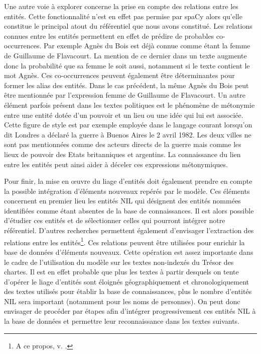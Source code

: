 \documentclass[a4paper,12pt,twoside]{book}
\begin{document}
	Une autre voie à explorer concerne la prise en compte des relations entre les entités. Cette fonctionnalité n'est en effet pas permise par spaCy alors qu'elle constitue le principal atout du référentiel que nous avons constitué. Les relations connues entre les entités permettent en effet de prédire de probables co-occurrences. Par exemple Agnès du Bois est déjà connue comme étant la femme de Guillaume de Flavacourt. La mention de ce dernier dans un texte augmente donc la probabilité que sa femme le soit aussi, notamment si le texte contient le mot \og Agnès\fg{}. Ces co-occurrences peuvent également être déterminantes pour former les alias des entités. Dans le cas précédent, la même Agnès du Bois peut être mentionnée par l'expression \og femme de Guillaume de Flavacourt\fg{}. Un autre élément parfois présent dans les textes politiques est le phénomène de métonymie entre une entité dotée d'un pouvoir et un lieu ou une idée qui lui est associée. Cette figure de style est par exemple employée dans le langage courant lorsqu'on dit \og Londres a déclaré la guerre à Buenos Aires le 2 avril 1982\fg{}. Les deux villes ne sont pas mentionnées comme des acteurs directs de la guerre mais comme les lieux de pouvoir des Etats britanniques et argentins. La connaissance du lien entre les entités peut ainsi aider à déceler ces expressions métonymiques. 
	
	Pour finir, la mise en œuvre du liage d'entités doit également prendre en compte la possible intégration d'éléments nouveaux repérés par le modèle. Ces éléments concernent en premier lieu les entités NIL qui désignent des entités nommées identifiées comme étant absentes de la base de connaissances. Il est alors possible d'étudier ces entités et de sélectionner celles qui pourront intégrer notre référentiel. D'autres recherches permettent également d'envisager l'extraction des relations entre les entités\footnote{A ce propos, v. \cite[p. 169--180]{dupont_structuration_2017}.}. Ces relations peuvent être utilisées pour enrichir la base de données d'éléments nouveaux. Cette opération est assez importante dans le cadre de l'utilisation du modèle sur les textes non-indexés du Trésor des chartes. Il est en effet probable que plus les textes à partir desquels on tente d'opérer le liage d'entités sont éloignés géographiquement et chronologiquement des textes utilisés pour établir la base de connaissances, plus le nombre d'entités NIL sera important (notamment pour les noms de personnes). On peut donc envisager de procéder par étapes afin d'intégrer progressivement ces entités NIL à la base de données et permettre leur reconnaissance dans les textes suivants.
	
\end{document}
